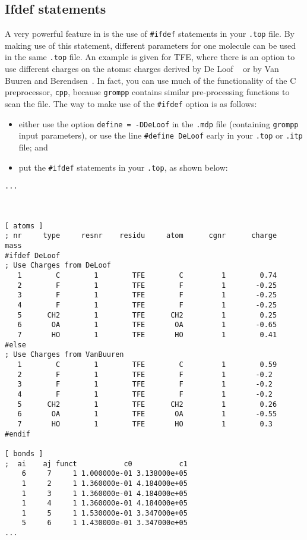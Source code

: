 \subsection{Ifdef statements}
\label{subsec:ifdef}
A very powerful feature in {\gromacs} is the use of {\tt \#ifdef}
statements in your {\tt *.top} file. By making use of this statement,
different parameters for one molecule can be used in the same
{\tt *.top} file. An example is given for TFE, where there is an option to
use different charges on the atoms: charges derived by De Loof
{\etal}~\cite{Loof92} or by Van Buuren and
Berendsen~\cite{Buuren93a}. In fact, you can use much of the functionality of the
C preprocessor, {\tt cpp}, because {\tt grompp} contains similar pre-processing
functions to scan the file.  The
way to make use of the {\tt \#ifdef} option is as follows:
\begin{itemize}
\item either use the option {\tt define = -DDeLoof} in the
      {\tt *.mdp} file (containing {\tt grompp} input
      parameters), or use the line {\tt \#define DeLoof}
      early in your {\tt *.top} or {\tt *.itp} file; and
\item put the {\tt \#ifdef} statements in your {\tt *.top}, as
      shown below: 
\end{itemize}

{\small
\begin{verbatim}
...



[ atoms ]
; nr     type     resnr    residu     atom      cgnr      charge        mass
#ifdef DeLoof
; Use Charges from DeLoof
   1        C        1        TFE        C         1        0.74        
   2        F        1        TFE        F         1       -0.25        
   3        F        1        TFE        F         1       -0.25        
   4        F        1        TFE        F         1       -0.25        
   5      CH2        1        TFE      CH2         1        0.25        
   6       OA        1        TFE       OA         1       -0.65        
   7       HO        1        TFE       HO         1        0.41        
#else
; Use Charges from VanBuuren
   1        C        1        TFE        C         1        0.59        
   2        F        1        TFE        F         1       -0.2         
   3        F        1        TFE        F         1       -0.2         
   4        F        1        TFE        F         1       -0.2         
   5      CH2        1        TFE      CH2         1        0.26        
   6       OA        1        TFE       OA         1       -0.55        
   7       HO        1        TFE       HO         1        0.3         
#endif

[ bonds ]
;  ai    aj funct           c0           c1
    6     7     1 1.000000e-01 3.138000e+05 
    1     2     1 1.360000e-01 4.184000e+05 
    1     3     1 1.360000e-01 4.184000e+05 
    1     4     1 1.360000e-01 4.184000e+05 
    1     5     1 1.530000e-01 3.347000e+05 
    5     6     1 1.430000e-01 3.347000e+05 
...
\end{verbatim}}

